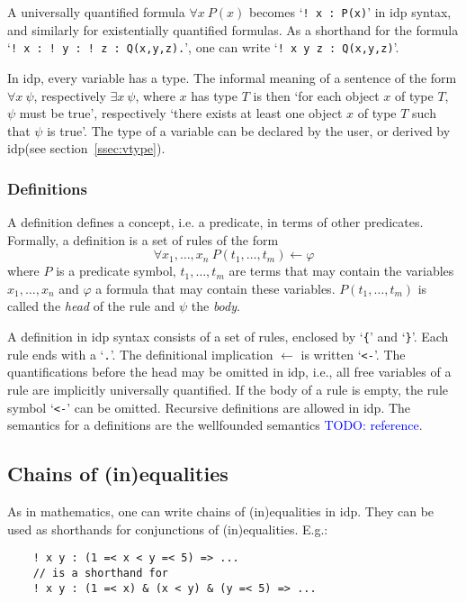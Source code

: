 \documentclass[a4]{article}
\newcommand{\idp}{{\sc idp}\xspace}
\newcommand{\todo}[1]{\textcolor{blue}{TODO: #1}}
\newcommand{\rul}{\leftarrow}
\begin{document}
A universally quantified formula $\forall x\ P(x)$ becomes `{\tt !\,x\,:\,P(x)}' in \idp syntax, and similarly for existentially quantified formulas. As a shorthand for the formula `{\tt !\,x\,:\,!\,y\,:\,!\,z\,:\,Q(x,y,z).}', one can write `{\tt !\,x y z\,:\,Q(x,y,z)}'. 



In \idp, every variable has a type. The informal meaning of a sentence of the form $\forall x\ \psi$, respectively $\exists x\ \psi$, where $x$ has type $T$ is then `for each object $x$ of type $T$, $\psi$ must be true', respectively `there exists at least one object $x$ of type $T$ such that $\psi$ is true'. The type of a variable can be declared by the user, or derived by \idp (see section~\ref{ssec:vtype}).


\subsubsection{Definitions}
A definition defines a concept, i.e. a predicate, in terms of other predicates. Formally, a definition is a set of rules of the form 
\[ \forall x_1,\ldots,x_n\ P(t_1,\ldots,t_m) \rul \varphi \]
where $P$ is a predicate symbol, $t_1,\ldots,t_m$ are terms that may contain the variables $x_1,\ldots,x_n$ and $\varphi$ a formula that may contain these variables. $P(t_1,\ldots,t_m)$ is called the \emph{head} of the rule and $\psi$ the \emph{body}. 

A definition in \idp syntax consists of a set of rules, enclosed by `{\tt \{}' and `{\tt \}}'. Each rule ends with a `{\tt .}'. The definitional implication $\rul$ is written `{\tt <-}'. The quantifications before the head may be omitted in \idp, i.e., all free variables of a rule are implicitly universally quantified. If the body of a rule is empty, the rule symbol `{\tt <-}' can be omitted. Recursive definitions are allowed in \idp. The semantics for a definitions are the wellfounded semantics \todo{reference}.





\subsection{Chains of (in)equalities}
As in mathematics, one can write chains of (in)equalities in \idp. They can be used as shorthands for conjunctions of (in)equalities. E.g.:
\begin{lstlisting}
	! x y : (1 =< x < y =< 5) => ...
	// is a shorthand for
	! x y : (1 =< x) & (x < y) & (y =< 5) => ...
\end{lstlisting}
\end{document}
